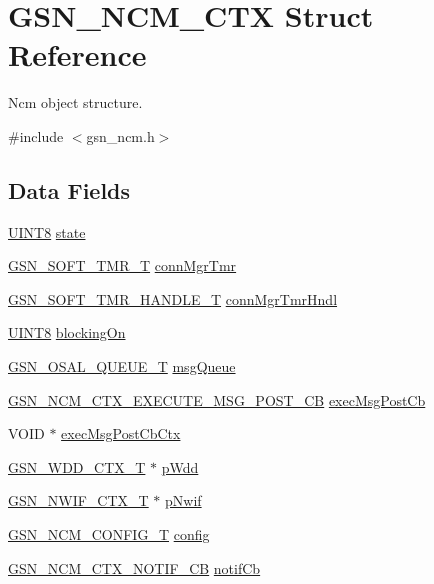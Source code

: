 \hypertarget{a00158}{
\section{GSN\_\-NCM\_\-CTX Struct Reference}
\label{a00158}
}


Ncm object structure.  




{\ttfamily \#include $<$gsn\_\-ncm.h$>$}

\subsection*{Data Fields}
\begin{DoxyCompactItemize}
\item 
\hyperlink{a00660_gab27e9918b538ce9d8ca692479b375b6a}{UINT8} \hyperlink{a00158_a6e9c4cbd32a1178b12f3a61f6855c896}{state}
\item 
\hyperlink{a00229}{GSN\_\-SOFT\_\-TMR\_\-T} \hyperlink{a00158_a5d664c13d9e783d00d5cfc011cd1b61f}{connMgrTmr}
\item 
\hyperlink{a00229}{GSN\_\-SOFT\_\-TMR\_\-HANDLE\_\-T} \hyperlink{a00158_a5c4fd3c07583992a7b7b769bb0e1a950}{connMgrTmrHndl}
\item 
\hyperlink{a00660_gab27e9918b538ce9d8ca692479b375b6a}{UINT8} \hyperlink{a00158_ae88d491fc834aaae7cc9c066719d285b}{blockingOn}
\item 
\hyperlink{a00628_gaebe1c924d01bf6607bd65961bf134095}{GSN\_\-OSAL\_\-QUEUE\_\-T} \hyperlink{a00158_a3525baeed8d9f795ed0c44437f548da2}{msgQueue}
\item 
\hyperlink{a00668_gaf3a0737ada4d7a112e4fff6779bc8162}{GSN\_\-NCM\_\-CTX\_\-EXECUTE\_\-MSG\_\-POST\_\-CB} \hyperlink{a00158_a5603e3f15c0a3cf1d8b11f8d09853a34}{execMsgPostCb}
\item 
VOID $\ast$ \hyperlink{a00158_aa13ea63dd76c4df311eda6a811d384f5}{execMsgPostCbCtx}
\item 
\hyperlink{a00108}{GSN\_\-WDD\_\-CTX\_\-T} $\ast$ \hyperlink{a00158_a97684b58b7a05f9b282a86a26929e1ba}{pWdd}
\item 
\hyperlink{a00167}{GSN\_\-NWIF\_\-CTX\_\-T} $\ast$ \hyperlink{a00158_a98d510676ecd134a5e9ac61bf222cded}{pNwif}
\item 
\hyperlink{a00157}{GSN\_\-NCM\_\-CONFIG\_\-T} \hyperlink{a00158_a5c9f4a124595ac5b08eebf1fd8ee601c}{config}
\item 
\hyperlink{a00668_ga9fb71d435556873549a9da8758741a14}{GSN\_\-NCM\_\-CTX\_\-NOTIF\_\-CB} \hyperlink{a00158_a8b4a72e6fff7893cb12d41268dcdbdf7}{notifCb}

\end{DoxyCompactItemize}
